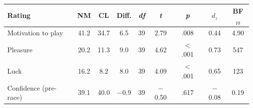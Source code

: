 \begin{tabular}{lcccccccc}
\toprule
Rating & NM & CL & Diff. & \textit{df} & \textit{t} & \textit{p} & $d_z$ & BF$_{10}$ \\
\midrule
Motivation to play & 41.2 & 34.7 & 6.5 & 39 & 2.79 & .008 & 0.44 & 4.90 \\
Pleasure & 20.2 & 11.3 & 9.0 & 39 & 4.62 & $<$ .001 & 0.73 & 547 \\
Luck & 16.2 & 8.2 & 8.0 & 39 & 4.09 & $<$ .001 & 0.65 & 123 \\
Confidence (pre-race) & 39.1 & 40.0 & $-$0.9 & 39 & $-$0.50 & .617 & $-$0.08 & 0.19 \\
\bottomrule
\end{tabular}

